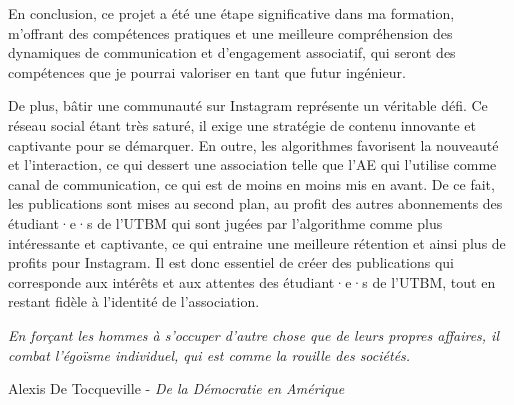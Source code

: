 En conclusion, ce projet a été une étape significative dans ma formation, m'offrant des compétences pratiques et une meilleure compréhension des dynamiques de communication et d'engagement associatif, qui seront des compétences que je pourrai valoriser en tant que futur ingénieur.

De plus, bâtir une communauté sur Instagram représente un véritable défi.
Ce réseau social étant très saturé, il exige une stratégie de contenu innovante et captivante pour se démarquer.
En outre, les algorithmes favorisent la nouveauté et l'interaction, ce qui dessert une association telle que l'\gls{AE} qui l'utilise comme canal de communication, ce qui est de moins en moins mis en avant.
De ce fait, les publications sont mises au second plan, au profit des autres abonnements des étudiant·e·s de l'\gls{UTBM} qui sont jugées par l'algorithme comme plus intéressante et captivante, ce qui entraine une meilleure rétention et ainsi plus de profits pour Instagram.
Il est donc essentiel de créer des publications qui corresponde aux intérêts et aux attentes des étudiant·e·s de l'\gls{UTBM}, tout en restant fidèle à l'identité de l'association.


\begin{center}
    \textit{\og En forçant les hommes à s'occuper d'autre chose que de leurs propres affaires, il combat l'égoïsme individuel, qui est comme la rouille des sociétés. \fg{}}

    Alexis De Tocqueville - \textit{De la Démocratie en Amérique}\cite{De_la_Democratie_en_Amerique}
\end{center}
